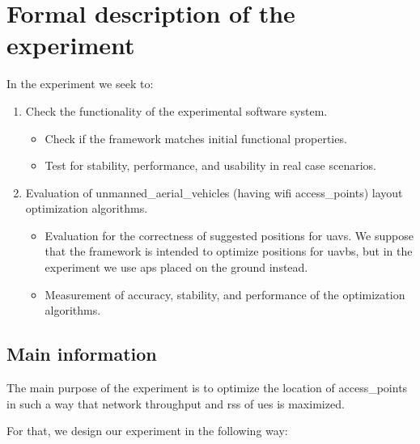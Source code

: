 \section{Formal description of the
	experiment}\label{formal-description-of-the-experiment}

In the experiment we seek to:

\begin{enumerate}
	\def\labelenumi{\arabic{enumi}.}
	\tightlist
	\item
	Check the functionality of the experimental software system.
	
	\begin{itemize}
		\tightlist
		\item
		Check if the framework matches initial functional properties.
		\item
		Test for stability, performance, and usability in real case scenarios.
	\end{itemize}
	
	\item
	Evaluation of \glspl{unmanned_aerial_vehicle} (having \gls{wifi} \glspl{access_point}) layout optimization algorithms.
	
	\begin{itemize}
		\tightlist
		\item
		Evaluation for the correctness of suggested positions for \glspl{uav}. We suppose that the framework is intended to optimize positions for \acrshort{uavbs}, but in the experiment we use \glspl{ap} placed on the ground instead.
		\item
		Measurement of accuracy, stability, and performance of the optimization algorithms.
	\end{itemize}
	
\end{enumerate}


\subsection{Main information}\label{main-information}

The main purpose of the experiment is to optimize the location of \glspl{access_point} in such a way that network throughput and \acrshort{rss} of \glspl{ue} is maximized.

For that, we design our experiment in the following way:

